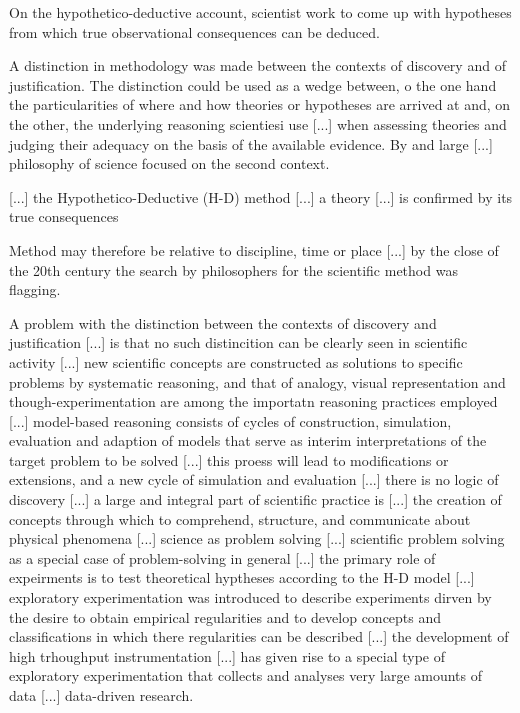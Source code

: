 {\color{red} On the hypothetico-deductive account, scientist work to come up with hypotheses from which true observational consequences can be deduced.}

{\color{red} A distinction in methodology was made between the contexts of discovery and of justification. The distinction could be used as a wedge between, o the one hand the particularities of where and how theories or hypotheses are arrived at and, on the other, the underlying reasoning scientiesi use [...] when assessing theories and judging their adequacy on the basis of the available evidence. By and large [...] philosophy of science focused on the second context.}

{\color{red} [...] the Hypothetico-Deductive (H-D) method [...] a theory [...] is confirmed by its true consequences}

{\color{red} Method may therefore be relative to discipline, time or place [...] by the close of the 20th century the search by philosophers for the scientific method was flagging.}

{\color{red} A problem with the distinction between the contexts of discovery and justification [...] is that no such distincition can be clearly seen in scientific activity [...] new scientific concepts are constructed as solutions to specific problems by systematic reasoning, and that of analogy, visual representation and though-experimentation are among the importatn reasoning practices employed [...] model-based reasoning consists of cycles of construction, simulation, evaluation and adaption of models that serve as interim interpretations of the target problem to be solved [...] this proess will lead to modifications or extensions, and a new cycle of simulation and evaluation [...] there is no logic of discovery [...] a large and integral part of scientific practice is [...] the creation of concepts through which to comprehend, structure, and communicate about physical phenomena [...] science as problem solving [...] scientific problem solving as a special case of problem-solving in general [...] the primary role of expeirments is to test theoretical hyptheses according to the H-D model [...] exploratory experimentation was introduced to describe experiments dirven by the desire to obtain empirical regularities and to develop concepts and classifications in which there regularities can be described [...] the development of high trhoughput instrumentation [...] has given rise to a special type of exploratory experimentation that collects and analyses very large amounts of data [...] data-driven research.}

